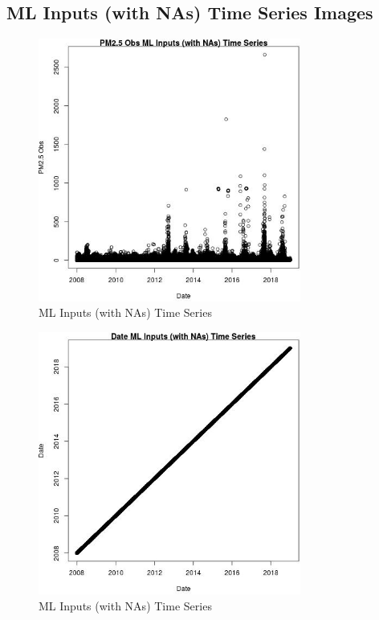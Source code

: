 
\subsection{ML Inputs (with NAs) Time Series Images} 
 

\begin{figure} 
\centering  
\includegraphics[width=0.77\textwidth]{Code_Outputs/Report_ML_input_PM25_Step4_part_e_de_duplicated_aveswNAs_PM25_ObsvDate.jpg} 
\caption{\label{fig:Report_ML_input_PM25_Step4_part_e_de_duplicated_aveswNAsPM25_ObsvDate}ML Inputs (with NAs) Time Series} 
\end{figure} 
 

\begin{figure} 
\centering  
\includegraphics[width=0.77\textwidth]{Code_Outputs/Report_ML_input_PM25_Step4_part_e_de_duplicated_aveswNAs_DatevDate.jpg} 
\caption{\label{fig:Report_ML_input_PM25_Step4_part_e_de_duplicated_aveswNAsDatevDate}ML Inputs (with NAs) Time Series} 
\end{figure} 
 

